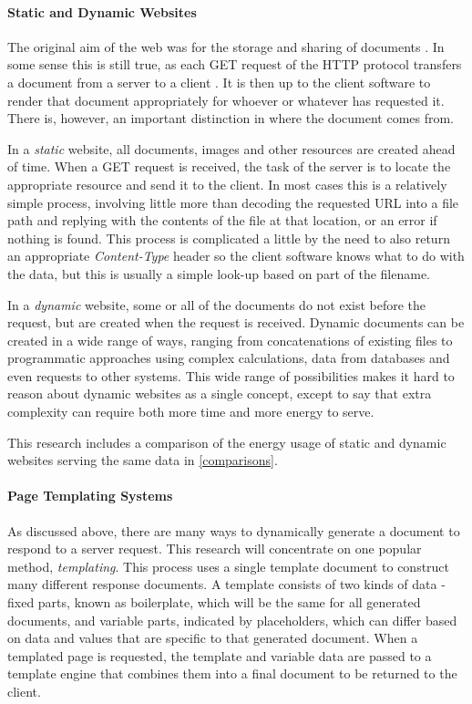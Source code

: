 \paragraph{Static and Dynamic Websites}

The original aim of the web was for the storage and sharing of documents \citep{Berners-Lee1992}. In some sense this is still true, as each GET request of the HTTP protocol transfers a document from a server to a client \citep{Berners-Lee1996} \citep{rfc2616}. It is then up to the client software to render that document appropriately for whoever or whatever has requested it. There is, however, an important distinction in where the document comes from.

In a \emph{static} website, all documents, images and other resources are created ahead of time. When a GET request is received, the task of the server is to locate the appropriate resource and send it to the client. In most cases this is a relatively simple process, involving little more than decoding the requested URL into a file path and replying with the contents of the file at that location, or an error if nothing is found. This process is complicated a little by the need to also return an appropriate \emph{Content-Type} header so the client software knows what to do with the data, but this is usually a simple look-up based on part of the filename.

In a \emph{dynamic} website, some or all of the documents do not exist before the request, but are created when the request is received. Dynamic documents can be created in a wide range of ways, ranging from concatenations of existing files to programmatic approaches using complex calculations, data from databases and even requests to other systems. This wide range of possibilities makes it hard to reason about dynamic websites as a single concept, except to say that extra complexity can require both more time and more energy to serve.

This research includes a comparison of the energy usage of static and dynamic websites serving the same data in \autoref{comparisons}.

\paragraph{Page Templating Systems}

As discussed above, there are many ways to dynamically generate a document to respond to a server request. This research will concentrate on one popular method, \emph{templating}. This process uses a single template document to construct many different response documents. A template consists of two kinds of data - fixed parts, known as \gls{boilerplate}, which will be the same for all generated documents, and variable parts, indicated by \gls{placeholder}s, which can differ based on data and values that are specific to that generated document. When a templated page is requested, the template and variable data are passed to a \gls{template engine} that combines them into a final document to be returned to the client.

